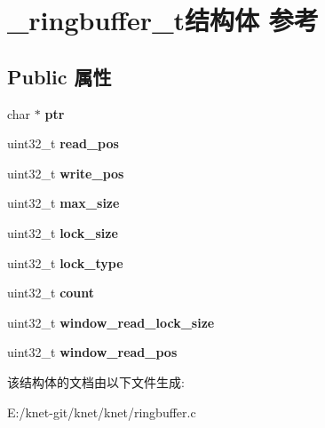 \hypertarget{struct__ringbuffer__t}{}\section{\+\_\+ringbuffer\+\_\+t结构体 参考}
\label{struct__ringbuffer__t}
\subsection*{Public 属性}
\begin{DoxyCompactItemize}
\item 
\hypertarget{struct__ringbuffer__t_a06a2abc3a4b83285ace3109f8690bef7}{}char $\ast$ {\bfseries ptr}\label{struct__ringbuffer__t_a06a2abc3a4b83285ace3109f8690bef7}

\item 
\hypertarget{struct__ringbuffer__t_a9054d048beeafd2337feef06197269be}{}uint32\+\_\+t {\bfseries read\+\_\+pos}\label{struct__ringbuffer__t_a9054d048beeafd2337feef06197269be}

\item 
\hypertarget{struct__ringbuffer__t_a65f65d9246e9d1addb77cebb3a1398e4}{}uint32\+\_\+t {\bfseries write\+\_\+pos}\label{struct__ringbuffer__t_a65f65d9246e9d1addb77cebb3a1398e4}

\item 
\hypertarget{struct__ringbuffer__t_ae27f1d62fc60a30ae440679a45005478}{}uint32\+\_\+t {\bfseries max\+\_\+size}\label{struct__ringbuffer__t_ae27f1d62fc60a30ae440679a45005478}

\item 
\hypertarget{struct__ringbuffer__t_a1604d2edfd6cb16b1b1222e10f041f98}{}uint32\+\_\+t {\bfseries lock\+\_\+size}\label{struct__ringbuffer__t_a1604d2edfd6cb16b1b1222e10f041f98}

\item 
\hypertarget{struct__ringbuffer__t_a6d8161c12ec7e82f48e29a2f0704ed7b}{}uint32\+\_\+t {\bfseries lock\+\_\+type}\label{struct__ringbuffer__t_a6d8161c12ec7e82f48e29a2f0704ed7b}

\item 
\hypertarget{struct__ringbuffer__t_a9230ba7c7afce7f234ebefa2c5fdc0bd}{}uint32\+\_\+t {\bfseries count}\label{struct__ringbuffer__t_a9230ba7c7afce7f234ebefa2c5fdc0bd}

\item 
\hypertarget{struct__ringbuffer__t_a8e6c75c56d0758af10593a6887813677}{}uint32\+\_\+t {\bfseries window\+\_\+read\+\_\+lock\+\_\+size}\label{struct__ringbuffer__t_a8e6c75c56d0758af10593a6887813677}

\item 
\hypertarget{struct__ringbuffer__t_ac1922e150f751ca3d7698837e820065d}{}uint32\+\_\+t {\bfseries window\+\_\+read\+\_\+pos}\label{struct__ringbuffer__t_ac1922e150f751ca3d7698837e820065d}

\end{DoxyCompactItemize}


该结构体的文档由以下文件生成\+:\begin{DoxyCompactItemize}
\item 
E\+:/knet-\/git/knet/knet/ringbuffer.\+c\end{DoxyCompactItemize}
